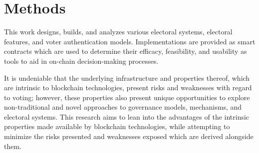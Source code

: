 \chapter{Methods}\label{chap:methods}


This work designs, builds, and analyzes various electoral systems, electoral
features, and voter authentication models. Implementations are provided as smart
contracts which are used to determine their efficacy, feasibility, and usability
as tools to aid in on-chain decision-making processes.

It is undeniable that the underlying infrastructure and properties thereof,
which are intrinsic to blockchain technologies, present risks and weaknesses
with regard to voting; however, these properties also present unique
opportunities to explore non-traditional and novel approaches to governance
models, mechanisms, and electoral systems. This research aims to lean into the
advantages of the intrinsic properties made available by blockchain
technologies, while attempting to minimize the risks presented and weaknesses
exposed which are derived alongside them.


%
%
%
%

